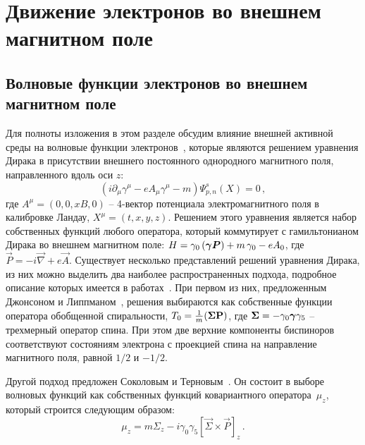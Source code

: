 \section{Движение электронов во внешнем магнитном поле}\label{Ch:Fermion}
\subsection{Волновые функции электронов во внешнем магнитном поле}
Для полноты изложения в этом разделе обсудим влияние внешней активной среды на 
волновые функции электронов~\cite{KM_Book_2013}, которые являются решением 
уравнения Дирака в присутствии внешнего постоянного однородного магнитного 
поля, направленного вдоль оси $z$:
\begin{equation}\label{eq:Dirac}
	(i\partial_\mu \gamma^\mu -e A_\mu \gamma^\mu - m) \Psi^s_{p,n}(X)=0\, ,
\end{equation}
где  $A^\mu=\left(0,0,xB,0\right)$ -- 
4-вектор потенциала электромагнитного поля в калибровке 
Ландау, $X^\mu=\left(t,x,y,z\right)$. Решением этого уравнения является набор собственных функций любого оператора, который 
коммутирует с гамильтонианом Дирака во внешнем магнитном поле: $H = \gamma_0 
\left( {\boldsymbol \gamma} {\boldsymbol P} \right) + m \, \gamma_0 -e A_0$, где $\vec{P} 
= -i \vec{\nabla} +e \vec{A}$. Существует несколько представлений решений 
уравнения Дирака, из них можно выделить два наиболее распространенных подхода, 
подробное описание которых имеется в 
работах~\cite{Melrose:1983,Sokolov:1986,Kuznetsov:2003,Bhattacharya:2004,Balantsev:2011,KM_Book_2013}.
 При первом из них, предложенным Джонсоном и Липпманом~\cite{Johnson:1949}, 
решения выбираются как собственные функции оператора обобщенной спиральности, 
$T_0 = \frac{1}{m} (\boldsymbol\Sigma \mathbf{P})$, где $\boldsymbol\Sigma = - \gamma_0 
\boldsymbol\gamma \gamma_5$  -- трехмерный оператор спина. При этом две верхние 
компоненты биспиноров соответствуют состояниям электрона с проекцией спина на 
направление магнитного поля, равной $1/2$ и   $-1/2$.

Другой подход предложен Соколовым и Терновым~\cite{Sokolov:1968}. Он состоит в выборе волновых функций как собственных функций ковариантного оператора~$\mu_z$, который строится следующим образом: 
\begin{equation}\label{eq:muz}
	\mu_z=m \Sigma_z - i \gamma_0\gamma_5\left[\vec{\Sigma}\times 
	\vec{P}\right]_z\, .
\end{equation}

